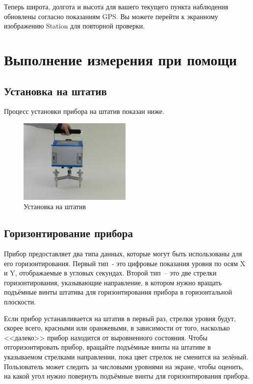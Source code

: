 Теперь широта, долгота и высота для вашего текущего пункта наблюдения
обновлены согласно показаниям GPS. Вы можете перейти к экранному изображению
Station для повторной проверки.

\section[Выполнение измерений]{Выполнение измерения при помощи \cg{}}

\subsection[Установка на штатив]{Установка \cg{} на штатив}

Процесс установки прибора \cg{} на штатив показан ниже.

\begin{figure}[h]
  \centering
  \includegraphics[width=0.49\textwidth]{figures/placing_the_cg6_autograv_on_its_tripod}
  \caption{Установка \cg{} на штатив}
  \label{fig:placing_the_cg6_autograv_on_its_tripod}
\end{figure}

\subsection[Горизонтирование прибора]{Горизонтирование прибора \cg{}}
\label{subsec:leveling_the_cg6_autograv}

Прибор \cg{} предоставляет два типа данных, которые могут быть использованы для
его горизонтирования. Первый тип~- это цифровые показания уровня по осям X и Y,
отображаемые в угловых секундах. Второй тип~-- это две стрелки горизонтирования,
указывающие направление, в котором нужно вращать подъёмные винты штатива для
горизонтирования прибора в горизонтальной плоскости.

Если прибор устанавливается на штатив в первый раз, стрелки уровня будут, скорее
всего, красными или оранжевыми, в зависимости от того, насколько <<далеко>>
прибор находится от выровненного состояния. Чтобы отгоризонтировать прибор, вращайте
подъёмные винты на штативе в указываемом стрелками направлении, пока цвет
стрелок не сменится на зелёный. Пользователь может следить за числовыми уровнями
на экране, чтобы оценить, на какой угол нужно повернуть подъёмные винты
для горизонтирования прибора.

